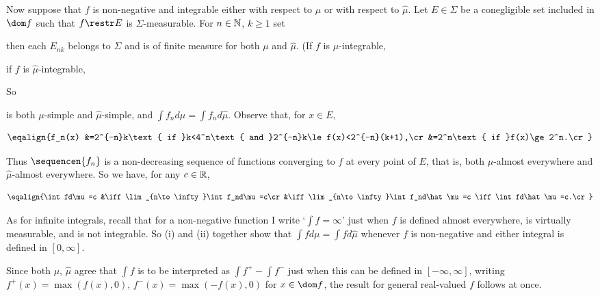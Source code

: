 { Now suppose that $f$ is non-negative and
integrable either with respect to $\mu$ or with respect to $\hat\mu$.
Let $E\in\Sigma$ be a conegligible set included in $\dom f$ such
that $f\restr E$ is $\Sigma$-measurable.    For $n\in\Bbb N$, $k\ge 1$ set


\noindent then each $E_{nk}$ belongs to $\Sigma$ and is of finite
measure for both $\mu$ and $\hat\mu$.   (If $f$ is $\mu$-integrable,


\noindent if $f$ is $\hat\mu$-integrable,


\noindent So


\noindent is both $\mu$-simple and $\hat\mu$-simple, and
$\int f_nd\mu=\int f_nd\hat\mu$.   Observe that, for $x\in E$,

$$\eqalign{f_n(x)
&=2^{-n}k\text{ if }k<4^n\text{ and }2^{-n}k\le f(x)<2^{-n}(k+1),\cr
&=2^n\text{ if }f(x)\ge 2^n.\cr}$$

\noindent Thus $\sequencen{f_n}$ is a non-decreasing
sequence of functions converging to $f$ at every point of $E$, that is,
both $\mu$-almost everywhere and $\hat\mu$-almost everywhere.   So we
have, for any $c\in\Bbb R$,

$$\eqalign{\int fd\mu=c
&\iff\lim_{n\to\infty}\int f_nd\mu=c\cr
&\iff\lim_{n\to\infty}\int f_nd\hat\mu=c
\iff\int fd\hat\mu=c.\cr}$$

\medskip

 As for infinite integrals, recall that for a non-negative
function I write `$\int f=\infty$' just when $f$ is defined almost
everywhere, is virtually measurable, and is not integrable.   So (i) and
(ii) together show that $\int fd\mu=\int fd\hat\mu$ whenever $f$ is
non-negative and either integral is defined in $[0,\infty]$.

\medskip

 Since both $\mu$, $\hat\mu$ agree that $\int f$ is to be
interpreted as $\int f^+-\int f^-$ just when this can be defined in
$[-\infty,\infty]$, writing $f^+(x)=\max(f(x),0)$,
$f^-(x)=\max(-f(x),0)$
for $x\in\dom f$, the result for general real-valued $f$ follows at
once.
}%

